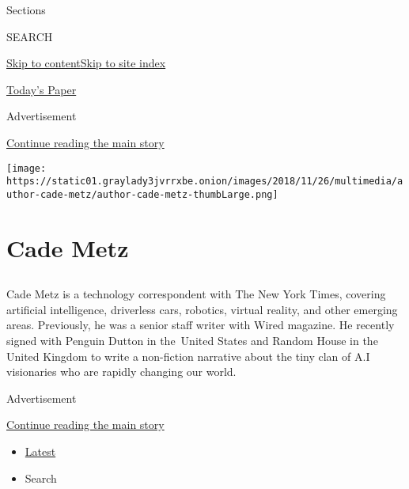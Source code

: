 Sections

SEARCH

\protect\hyperlink{site-content}{Skip to
content}\protect\hyperlink{site-index}{Skip to site index}

\href{https://myaccount.nytimes3xbfgragh.onion/auth/login?response_type=cookie\&client_id=vi}{}

\href{https://www.nytimes3xbfgragh.onion/section/todayspaper}{Today's
Paper}

Advertisement

\protect\hyperlink{after-top}{Continue reading the main story}

\texttt{[image: https://static01.graylady3jvrrxbe.onion/images/2018/11/26/multimedia/author-cade-metz/author-cade-metz-thumbLarge.png]}

\hypertarget{cade-metz}{%
\section{Cade Metz}\label{cade-metz}}

\hypertarget{section}{%
\subsection{}\label{section}}

Cade Metz is a technology correspondent with The New York Times,
covering artificial intelligence, driverless cars, robotics, virtual
reality, and other emerging areas. Previously, he was a senior staff
writer with Wired magazine. He recently signed with Penguin Dutton in
the~United States and Random House in the United Kingdom to write a
non-fiction narrative about the tiny clan of A.I visionaries who are
rapidly changing our world.

Advertisement

\protect\hyperlink{after-mid1}{Continue reading the main story}

\begin{itemize}
\tightlist
\item
  \protect\hyperlink{stream-panel}{Latest}
\item
  Search
\end{itemize}


